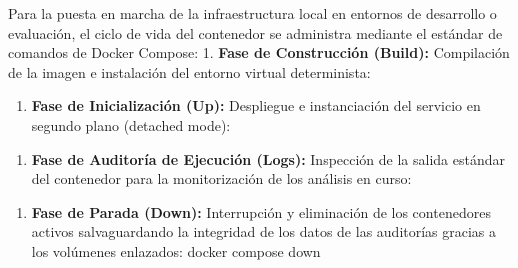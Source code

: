 Para la puesta en marcha de la infraestructura local en entornos de
desarrollo o evaluación, el ciclo de vida del contenedor se administra
mediante el estándar de comandos de Docker Compose: 1. \textbf{Fase de
Construcción (Build):} Compilación de la imagen e instalación del
entorno virtual determinista:

\begin{Shaded}
\begin{Highlighting}[]
\end{Highlighting}
\end{Shaded}

\begin{enumerate}
\def\labelenumi{\arabic{enumi}.}
\setcounter{enumi}{1}
\tightlist
\item
  \textbf{Fase de Inicialización (Up):} Despliegue e instanciación del
  servicio en segundo plano (detached mode):
\end{enumerate}

\begin{Shaded}
\begin{Highlighting}[]
\end{Highlighting}
\end{Shaded}

\begin{enumerate}
\def\labelenumi{\arabic{enumi}.}
\setcounter{enumi}{2}
\tightlist
\item
  \textbf{Fase de Auditoría de Ejecución (Logs):} Inspección de la
  salida estándar del contenedor para la monitorización de los análisis
  en curso:
\end{enumerate}

\begin{Shaded}
\begin{Highlighting}[]
\end{Highlighting}
\end{Shaded}

\begin{enumerate}
\def\labelenumi{\arabic{enumi}.}
\setcounter{enumi}{3}
\tightlist
\item
  \textbf{Fase de Parada (Down):} Interrupción y eliminación de los
  contenedores activos salvaguardando la integridad de los datos de las
  auditorías gracias a los volúmenes enlazados: docker compose down
\end{enumerate}

